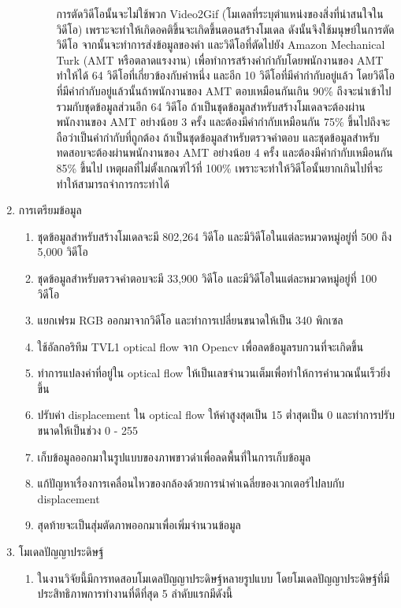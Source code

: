 \begin{enumerate}
\begin{enumerate}
\begin{enumerate}
		การตัดวิดีโอนั้นจะไม่ใช้พวก Video2Gif (โมเดลที่ระบุตำแหน่งของสิ่งที่น่าสนใจในวิดีโอ) เพราะจะทำให้เกิดอคติขึ้นจะเกิดขึ้นตอนสร้างโมเดล ดังนั้นจึงใช้มนุษย์ในการตัดวิดีโอ จากนั้นจะทำการส่งข้อมูลของคำ
		และวิดีโอที่ตัดไปยัง Amazon Mechanical Turk (AMT หรือตลาดแรงงาน) เพื่อทำการสร้างคำกำกับโดยพนักงานของ AMT ทำให้ได้ 64 วิดีโอที่เกี่ยวข้องกับคำหนึ่ง 
		และอีก 10 วิดีโอที่มีคำกำกับอยู่แล้ว โดยวิดีโอที่มีคำกำกับอยู่แล้วนั้นถ้าพนักงานของ AMT ตอบเหมือนกันเกิน 90\% ถึงจะนำเข้าไปรวมกับชุดข้อมูลส่วนอีก 64 วิดีโอ
		ถ้าเป็นชุดข้อมูลสำหรับสร้างโมเดลจะต้องผ่านพนักงานของ AMT อย่างน้อย 3 ครั้ง และต้องมีคำกำกับเหมือนกัน 75\% ขึ้นไปถึงจะถือว่าเป็นคำกำกับที่ถูกต้อง 
		ถ้าเป็นชุดข้อมูลสำหรับตรวจคำตอบ และชุดข้อมูลสำหรับทดสอบจะต้องผ่านพนักงานของ AMT อย่างน้อย 4 ครั้ง และต้องมีคำกำกับเหมือนกัน 85\% ขึ้นไป 
		เหตุผลที่ไม่ตั้งเกณฑ์ไว้ที่ 100\% เพราะจะทำให้วิดีโอนั้นยากเกินไปที่จะทำให้สามารถจำการกระทำได้	
	\end{enumerate}
\end{enumerate}
\clearpage
	\item การเตรียมข้อมูล
		\begin{enumerate}
			\item ชุดข้อมูลสำหรับสร้างโมเดลจะมี 802,264 วิดีโอ และมีวิดีโอในแต่ละหมวดหมู่อยู่ที่ 500 ถึง 5,000 วิดีโอ
			\item ชุดข้อมูลสำหรับตรวจคำตอบจะมี 33,900 วิดีโอ และมีวิดีโอในแต่ละหมวดหมู่อยู่ที่ 100 วิดีโอ
			\item แยกเฟรม RGB ออกมาจากวิดีโอ และทำการเปลี่ยนขนาดให้เป็น 340 พิกเซล
			\item ใช้อัลกอริทึม TVL1 optical flow จาก Opencv เพื่อลดข้อมูลรบกวนที่จะเกิดขึ้น
			\item ทำการแปลงค่าที่อยู่ใน optical flow ให้เป็นเลขจำนวนเต็มเพื่อทำให้การคำนวณนั้นเร็วยิ่งขึ้น
			\item ปรับค่า displacement ใน optical flow ให้ค่าสูงสุดเป็น 15 ต่ำสุดเป็น 0 และทำการปรับขนาดให้เป็นช่วง 0 - 255
			\item เก็บข้อมูลออกมาในรูปแบบของภาพขาวดำเพื่อลดพื้นที่ในการเก็บข้อมูล
			\item แก้ปัญหาเรื่องการเคลื่อนไหวของกล้องด้วยการนำค่าเฉลี่ยของเวกเตอร์ไปลบกับ displacement
			\item สุดท้ายจะเป็นสุ่มตัดภาพออกมาเพื่อเพิ่มจำนวนข้อมูล
		\end{enumerate}
	\item {โมเดลปัญญาประดิษฐ์}
	\begin{enumerate}
		\item ในงานวิจัยนี้มีการทดสอบโมเดลปัญญาประดิษฐ์หลายรูปแบบ โดยโมเดลปัญญาประดิษฐ์ที่มีประสิทธิภาพการทำงานที่ดีที่สุด 5 ลำดับแรกมีดังนี้

\end{enumerate}
\end{enumerate}
